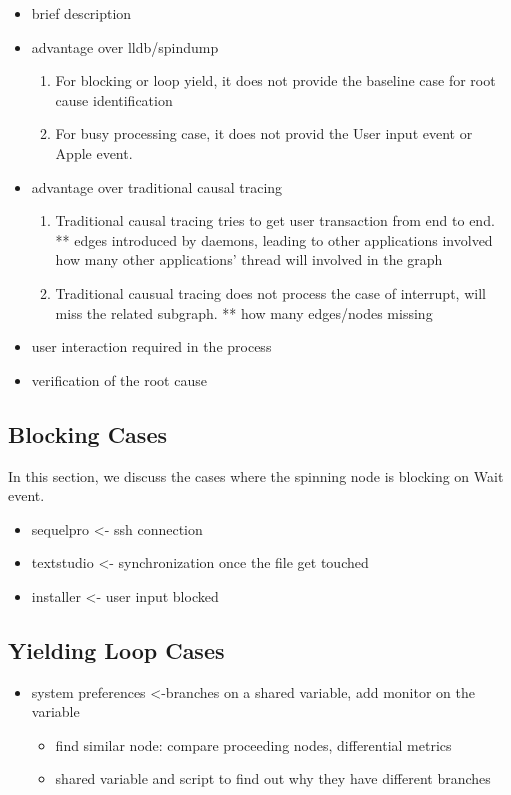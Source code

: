 \begin{itemize}
\item{brief description}
\item{advantage over lldb/spindump}
	\begin{enumerate}
	\item For blocking or loop yield, it does not provide the baseline case for root cause identification
	\item For busy processing case, it does not provid the User input event or Apple event.
	\end{enumerate}
\item{advantage over traditional causal tracing}
	\begin{enumerate}
	\item Traditional causal tracing tries to get user transaction from end to end.
		** edges introduced by daemons, leading to other applications involved
			how many other applications' thread will involved in the graph
	\item Traditional causual tracing does not process the case of interrupt,
		will miss the related subgraph.
		** how many edges/nodes missing
	\end{enumerate}
\item{user interaction required in the process}
\item{verification of the root cause}
\end{itemize}

\subsection{Blocking Cases}
In this section, we discuss the cases where the spinning node is blocking on Wait event.
\begin{itemize}
\item sequelpro <- ssh connection
\item textstudio <- synchronization once the file get touched %
\item installer <- user input blocked
\end{itemize}


\subsection{Yielding Loop Cases}
\begin{itemize}
\item system preferences <-branches on a shared variable, add monitor on the variable
	\begin{itemize}
		\item find similar node: compare proceeding nodes, differential metrics
		\item shared variable and script to find out why they have different branches
	\end{itemize}
\end{itemize}

